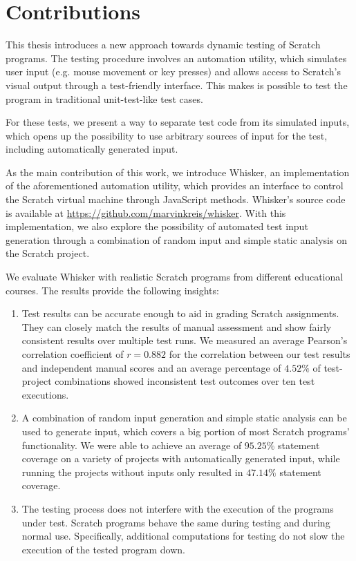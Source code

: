 \section{Contributions}

This thesis introduces a new approach towards dynamic testing of Scratch programs.
The testing procedure involves an automation utility, which simulates user input (e.g. mouse movement or key presses)
and allows access to Scratch's visual output through a test-friendly interface.
This makes is possible to test the program in traditional unit-test-like test cases.
\parspace

For these tests, we present a way to separate test code from its simulated inputs,
which opens up the possibility to use arbitrary sources of input for the test,
including automatically generated input.
\parspace

As the main contribution of this work, we introduce Whisker, an implementation of the aforementioned automation utility,
which provides an interface to control the Scratch virtual machine through JavaScript methods.
Whisker's source code is available at \url{https://github.com/marvinkreis/whisker}.
With this implementation, we also explore the possibility of automated test input generation through a combination of random input and simple static analysis on the Scratch project.
\parspace

We evaluate Whisker with realistic Scratch programs from different educational courses.
The results provide the following insights:

\begin{enumerate}[(1)]
    \item Test results can be accurate enough to aid in grading Scratch assignments.
        They can closely match the results of manual assessment and show fairly consistent results over multiple test runs.
        We measured an average Pearson's correlation coefficient of $r = 0.882$ for the correlation
        between our test results and independent manual scores and an average percentage of $4.52\%$ of test-project combinations showed inconsistent test outcomes over ten test executions.
    \item %
        A combination of random input generation and simple static analysis can be used to generate input, which covers a big portion of most Scratch programs' functionality.
        We were able to achieve an average of $95.25\%$ statement coverage on a variety of projects with automatically generated input,
        while running the projects without inputs only resulted in $47.14\%$ statement coverage.
    \item The testing process does not interfere with the execution of the programs under test.
        Scratch programs behave the same during testing and during normal use.
        Specifically, additional computations for testing do not slow the execution of the tested program down.
\end{enumerate}

